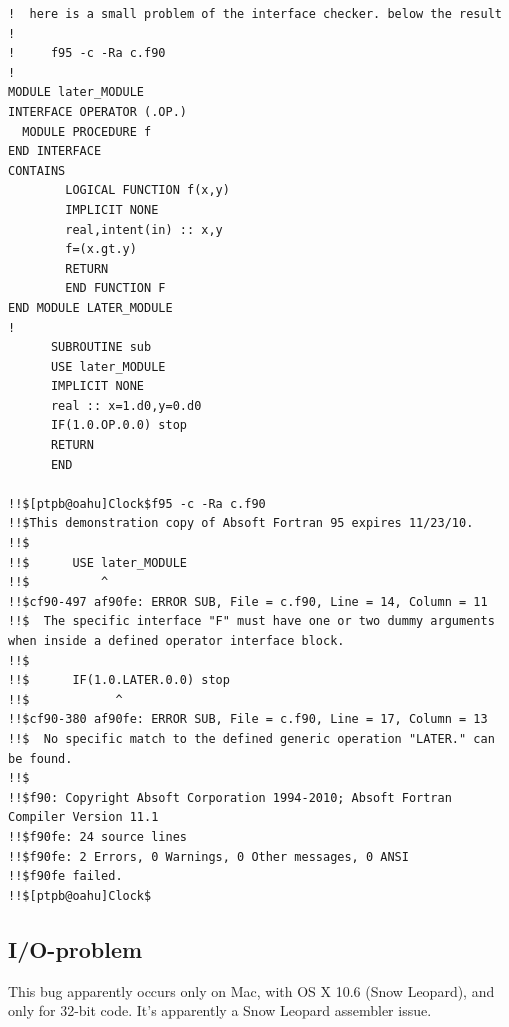 \documentclass[a4paper,10pt]{report}
\begin{document}
\begin{verbatim}
!  here is a small problem of the interface checker. below the result
!
!     f95 -c -Ra c.f90 
!
MODULE later_MODULE
INTERFACE OPERATOR (.OP.)
  MODULE PROCEDURE f
END INTERFACE
CONTAINS
        LOGICAL FUNCTION f(x,y)
        IMPLICIT NONE
        real,intent(in) :: x,y
        f=(x.gt.y)
        RETURN
        END FUNCTION F
END MODULE LATER_MODULE
!
      SUBROUTINE sub
      USE later_MODULE
      IMPLICIT NONE
      real :: x=1.d0,y=0.d0
      IF(1.0.OP.0.0) stop
      RETURN
      END

!!$[ptpb@oahu]Clock$f95 -c -Ra c.f90
!!$This demonstration copy of Absoft Fortran 95 expires 11/23/10.
!!$
!!$      USE later_MODULE
!!$          ^            
!!$cf90-497 af90fe: ERROR SUB, File = c.f90, Line = 14, Column = 11 
!!$  The specific interface "F" must have one or two dummy arguments when inside a defined operator interface block.
!!$
!!$      IF(1.0.LATER.0.0) stop
!!$            ^                
!!$cf90-380 af90fe: ERROR SUB, File = c.f90, Line = 17, Column = 13 
!!$  No specific match to the defined generic operation "LATER." can be found.
!!$
!!$f90: Copyright Absoft Corporation 1994-2010; Absoft Fortran Compiler Version 11.1 
!!$f90fe: 24 source lines
!!$f90fe: 2 Errors, 0 Warnings, 0 Other messages, 0 ANSI
!!$f90fe failed.
!!$[ptpb@oahu]Clock$
\end{verbatim}


\subsection{I/O-problem}

This bug apparently occurs only on Mac, with OS X 10.6 (Snow Leopard),
and only for 32-bit code. It's apparently a Snow Leopard assembler
issue. 
\end{document}
